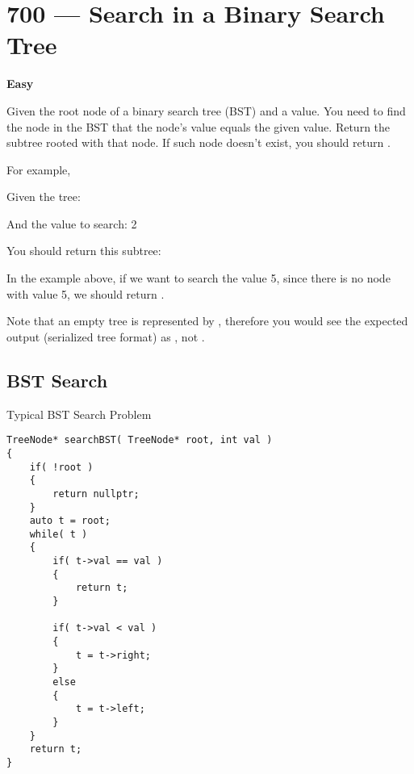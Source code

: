 \section{700 --- Search in a Binary Search Tree}

\textbf{Easy}

Given the root node of a binary search tree (BST) and a value. You need to find the node in the BST that the node's value equals the given value. Return the subtree rooted with that node. If such node doesn't exist, you should return .

For example, 

Given the tree:

\begin{figure}[H]
\end{figure}

And the value to search: 2

You should return this subtree:

\begin{figure}[H]
\end{figure}
%
In the example above, if we want to search the value 5, since there is no node with value 5, we should return .

Note that an empty tree is represented by , therefore you would see the expected output (serialized tree format) as \fcc{[]}, not .

\subsection{BST Search}
Typical BST Search Problem

\setcounter{lstlisting}{0}
\begin{lstlisting}[style=customc, caption={BST}]
TreeNode* searchBST( TreeNode* root, int val )
{
    if( !root )
    {
        return nullptr;
    }
    auto t = root;
    while( t )
    {
        if( t->val == val )
        {
            return t;
        }

        if( t->val < val )
        {
            t = t->right;
        }
        else
        {
            t = t->left;
        }
    }
    return t;
}
\end{lstlisting}